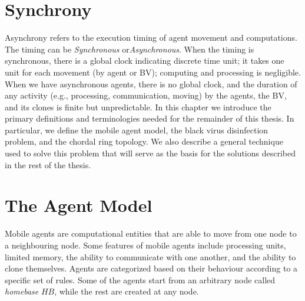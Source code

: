 \section{Synchrony}
Asynchrony refers to the execution timing of agent movement and computations. The timing can be {\em Synchronous} or{\em Asynchronous}. When the timing is synchronous, there is a global clock indicating discrete time unit; it takes one unit for each movement (by agent or BV); computing and processing is negligible.
When we have asynchronous agents, there is no global clock, and the duration of any activity (e.g., processing, communication, moving) by the agents, the BV, and its clones is finite but unpredictable.
In this chapter we  introduce the primary definitions and terminologies needed for the remainder of this thesis.
In particular, we define the mobile agent model, the black virus  disinfection problem,  and the chordal ring topology. We also describe a general technique used to solve this problem that will serve as the basis for the solutions described in the rest of the thesis.




\section{The Agent Model} 


Mobile agents are computational entities that are able to move from one node to a neighbouring node. Some features of mobile agents include processing units, limited memory, the ability to communicate with one another, and the ability to clone themselves. Agents are categorized based on their behaviour according to a specific set of rules. Some of the agents start from an arbitrary node called  {\em homebase} $HB$,  while the rest  are created  at any node. 
  
